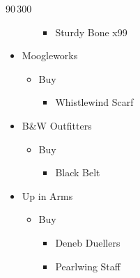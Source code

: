 \begin{shop}{90\,300}
\begin{itemize}
\begin{itemize}
\begin{itemize}
						\item Sturdy Bone x99
					\end{itemize}
			\end{itemize}
		\item Moogleworks
			\begin{itemize}
				\item Buy
					\begin{itemize}
						\item Whistlewind Scarf
					\end{itemize}
			\end{itemize}
		\item B\&W Outfitters
			\begin{itemize}
				\item Buy
					\begin{itemize}
						\item Black Belt
					\end{itemize}
			\end{itemize}
		\item Up in Arms
			\begin{itemize}
				\item Buy
					\begin{itemize}
						\item Deneb Duellers
						\item Pearlwing Staff
					\end{itemize}
			\end{itemize}
	\end{itemize}
\end{shop}

